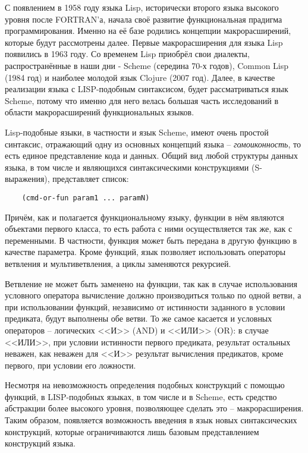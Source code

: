 С появлением в 1958 году языка Lisp, исторически второго языка высокого уровня после FORTRAN'а, начала своё развитие функциональная прадигма программирования. Именно на её базе родились концепции макрорасширений, которые будут рассмотрены далее. Первые макрорасширения для языка Lisp появились в 1963 году\cite{Steele:1993:EL:155360.155373}. Со временем Lisp приобрёл свои диалекты, распространённые в наши дни - Scheme (середина 70-х годов), Common Lisp (1984 год) и наиболее молодой язык Clojure (2007 год). Далее, в качестве реализации языка с LISP-подобным синтаксисом, будет рассматриваться язык Scheme, потому что именно для него велась большая часть исследований в области макрорасширений функциональных языков.

Lisp-подобные языки, в частности и язык Scheme, имеют очень простой синтаксис, отражающий одну из основных концепций языка -- \textit{гомоиконность}, то есть единое представление кода и данных. Общий вид любой структуры данных языка, в том числе и являющихся синтаксическими конструкциями (S-выражения), представляет список:

\begin{lstlisting}
	(cmd-or-fun param1 ... paramN)
\end{lstlisting}

Причём, как и полагается функциональному языку, функции в нём являются объектами первого класса, то есть работа с ними осуществляется так же, как с переменными. В частности, функция может быть передана в другую функцию в качестве параметра. Кроме функций, язык позволяет использовать операторы ветвления и мультиветвления, а циклы заменяются рекурсией.

Ветвление не может быть заменено на функции, так как в случае использования условного оператора вычисление должно производиться только по одной ветви, а при использовании функций, независимо от истинности заданного в условии предиката, будут выполнены обе ветви\cite{Abelson:1996:SIC:547755}. То же самое касается и условных операторов -- логических <<И>> (AND) и <<ИЛИ>> (OR): в случае <<ИЛИ>>, при условии истинности первого предиката, результат остальных неважен, как неважен для <<И>> результат вычисления предикатов, кроме первого, при условии его ложности.

Несмотря на невозможность определения подобных конструкций с помощью функций, в LISP-подобных языках, в том числе и в Scheme, есть средство абстракции более высокого уровня, позволяющее сделать это -- макрорасширения. Таким образом, появляется возможность введения в язык новых синтаксических конструкций, которые ограничиваются лишь базовым представлением конструкций языка.

